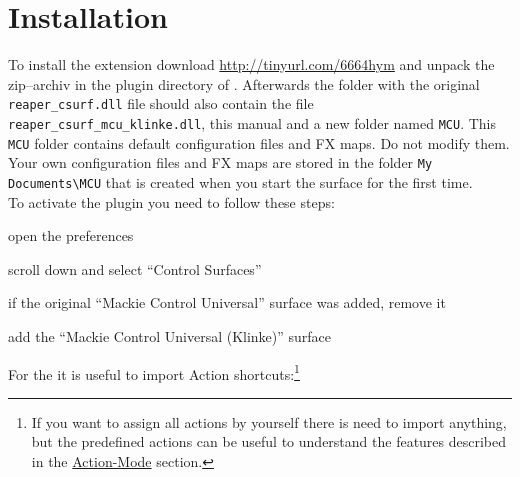 \section{Installation}\label{installation} 

To install the extension download \url{http://tinyurl.com/6664hym}
and unpack the zip--archiv in the
plugin directory of \reaper. Afterwards the folder with the original
{\tt reaper\_csurf.dll} file should also contain the file {\tt
  reaper\_csurf\_mcu\_klinke.dll}, this manual and a new folder named
{\tt MCU}. This {\tt MCU} folder contains default configuration files
and FX maps. Do not modify them. Your own configuration files and FX
maps are stored in the folder {\tt My Documents\textbackslash MCU}
that is created when you start the
\mcu surface for the first time.\\

\noindent
To activate the plugin you need to follow these steps:
\begin{compactitem}
\item open the \reaper preferences
\item scroll down and select ``Control Surfaces'' 
\item if the original ``Mackie Control Universal'' surface was added, remove it
\item add the ``Mackie Control Universal (Klinke)'' surface
\end{compactitem}


\noindent
For the \actionmode it is useful to import Action
shortcuts:\footnote{If you want to assign all actions by yourself
  there is need to import anything, but  the predefined actions can be
  useful to understand the features described in the
  \hyperref[actionmode]{Action-Mode} section.}
 
